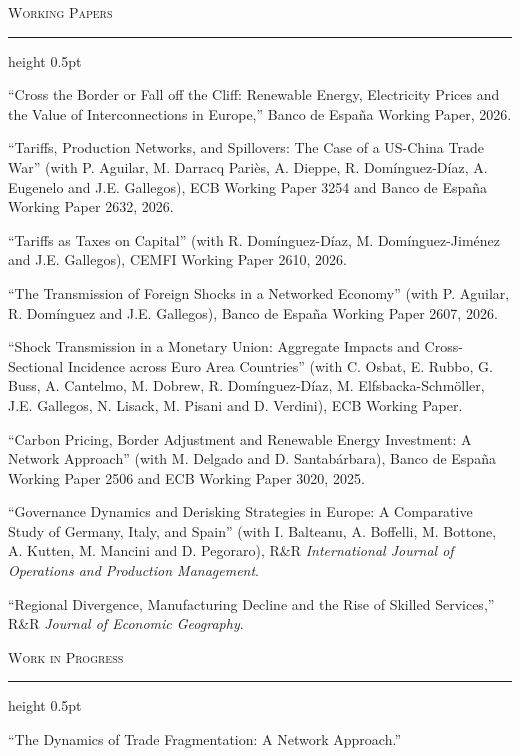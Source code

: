 \documentclass[11pt]{article}
\newcommand{\cvsection}[1]{%
  \vspace{1.1em}\par
  {\large\scshape #1}\par
  \vspace{0.15em}
  \hrule height 0.5pt
  \vspace{0.7em}
}
\newenvironment{cvlist}{%
  \begin{list}{}{%
    \setlength{\leftmargin}{1.4em}%
    \setlength{\itemindent}{-1.4em}%
    \setlength{\itemsep}{0.55em}%
    \setlength{\parsep}{0pt}%
    \setlength{\topsep}{0pt}}%
}{\end{list}}
\begin{document}
\cvsection{Working Papers}
\begin{cvlist}
\item ``Cross the Border or Fall off the Cliff: Renewable Energy, Electricity Prices and the Value of Interconnections in Europe,'' Banco de España Working Paper, 2026.
\item ``Tariffs, Production Networks, and Spillovers: The Case of a US-China Trade War'' (with P. Aguilar, M. Darracq Pariès, A. Dieppe, R. Domínguez-Díaz, A. Eugenelo and J.E. Gallegos), ECB Working Paper 3254 and Banco de España Working Paper 2632, 2026.
\item ``Tariffs as Taxes on Capital'' (with R. Domínguez-Díaz, M. Domínguez-Jiménez and J.E. Gallegos), CEMFI Working Paper 2610, 2026.
\item ``The Transmission of Foreign Shocks in a Networked Economy'' (with P. Aguilar, R. Domínguez and J.E. Gallegos), Banco de España Working Paper 2607, 2026.
\item ``Shock Transmission in a Monetary Union: Aggregate Impacts and Cross-Sectional Incidence across Euro Area Countries'' (with C. Osbat, E. Rubbo, G. Buss, A. Cantelmo, M. Dobrew, R. Domínguez-Díaz, M. Elfsbacka-Schmöller, J.E. Gallegos, N. Lisack, M. Pisani and D. Verdini), ECB Working Paper.
\item ``Carbon Pricing, Border Adjustment and Renewable Energy Investment: A Network Approach'' (with M. Delgado and D. Santabárbara), Banco de España Working Paper 2506 and ECB Working Paper 3020, 2025.
\item ``Governance Dynamics and Derisking Strategies in Europe: A Comparative Study of Germany, Italy, and Spain'' (with I. Balteanu, A. Boffelli, M. Bottone, A. Kutten, M. Mancini and D. Pegoraro), R\&R \textit{International Journal of Operations and Production Management}.
\item ``Regional Divergence, Manufacturing Decline and the Rise of Skilled Services,'' R\&R \textit{Journal of Economic Geography}.
\end{cvlist}

\cvsection{Work in Progress}
\begin{cvlist}
\item ``The Dynamics of Trade Fragmentation: A Network Approach.''
\end{cvlist}
\end{document}
